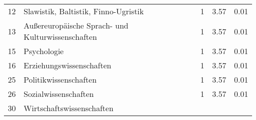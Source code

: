 \begin{longtable}{lXrrr}
     12 &
     \multicolumn{1}{X}{ Slawistik, Baltistik, Finno-Ugristik   } &


       \num{1} &
       \num[round-mode=places,round-precision=2]{3.57} &
         \num[round-mode=places,round-precision=2]{0.01} \\

     13 &
     \multicolumn{1}{X}{ Außereuropäische Sprach- und Kulturwissenschaften   } &


       \num{1} &
       \num[round-mode=places,round-precision=2]{3.57} &
         \num[round-mode=places,round-precision=2]{0.01} \\

     15 &
     \multicolumn{1}{X}{ Psychologie   } &


       \num{1} &
       \num[round-mode=places,round-precision=2]{3.57} &
         \num[round-mode=places,round-precision=2]{0.01} \\

     16 &
     \multicolumn{1}{X}{ Erziehungswissenschaften   } &


       \num{1} &
       \num[round-mode=places,round-precision=2]{3.57} &
         \num[round-mode=places,round-precision=2]{0.01} \\

     25 &
     \multicolumn{1}{X}{ Politikwissenschaften   } &


       \num{1} &
       \num[round-mode=places,round-precision=2]{3.57} &
         \num[round-mode=places,round-precision=2]{0.01} \\

     26 &
     \multicolumn{1}{X}{ Sozialwissenschaften   } &


       \num{1} &
       \num[round-mode=places,round-precision=2]{3.57} &
         \num[round-mode=places,round-precision=2]{0.01} \\

     30 &
     \multicolumn{1}{X}{ Wirtschaftswissenschaften   } &



\end{longtable}
